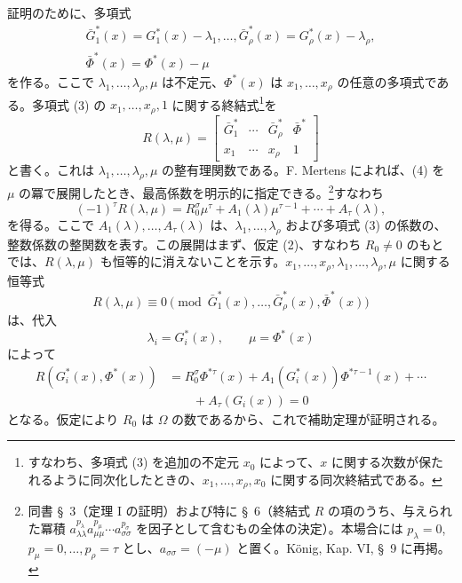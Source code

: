 \documentclass[11pt]{jlreq}
\begin{document}
証明のために、多項式
\begin{equation}
\begin{gathered}
  \bar G_1^*(x)=G_1^*(x)-\lambda_1,
  \ldots,
  \bar G_\rho^*(x)=G_\rho^*(x)-\lambda_\rho,\\
  \bar\Phi^*(x)=\Phi^*(x)-\mu
\end{gathered}
\tag{3}
\end{equation}
を作る。ここで $\lambda_1,\ldots,\lambda_\rho,\mu$ は不定元、$\Phi^*(x)$ は $x_1,\ldots,x_\rho$ の任意の多項式である。多項式 (3) の $x_1,\ldots,x_\rho,1$ に関する終結式\footnote{すなわち、多項式 (3) を追加の不定元 $x_0$ によって、$x$ に関する次数が保たれるように同次化したときの、$x_1,\ldots,x_\rho,x_0$ に関する同次終結式である。}を
\begin{equation}
  R(\lambda,\mu)=\left[
  \begin{array}{cccc}
   \bar G_1^*&\cdots&\bar G_\rho^*&\bar\Phi^*\\
   x_1&\cdots&x_\rho&1
  \end{array}
  \right]
\tag{4}
\end{equation}
と書く。これは $\lambda_1,\ldots,\lambda_\rho,\mu$ の整有理関数である。F. Mertens によれば、(4) を $\mu$ の冪で展開したとき、最高係数を明示的に指定できる。\footnote{同書 \S\ 3（定理 I の証明）および特に \S\ 6（終結式 $R$ の項のうち、与えられた冪積 $a_{\lambda\lambda}^{p_\lambda}a_{\mu\mu}^{p_\mu}\cdots a_{\sigma\sigma}^{p_\sigma}$ を因子として含むもの全体の決定）。本場合には $p_\lambda=0$, $p_\mu=0,\ldots,p_\rho=\tau$ とし、$a_{\sigma\sigma}=(-\mu)$ と置く。König, Kap. VI, \S\ 9 に再掲。}すなわち
\begin{equation}
  (-1)^\tau R(\lambda,\mu)
  =R_0^\sigma\mu^\tau+A_1(\lambda)\mu^{\tau-1}+\cdots+A_\tau(\lambda),
\tag{5}
\end{equation}
を得る。ここで $A_1(\lambda),\ldots,A_\tau(\lambda)$ は、$\lambda_1,\ldots,\lambda_\rho$ および多項式 (3) の係数の、整数係数の整関数を表す。この展開はまず、仮定 (2)、すなわち $R_0\ne0$ のもとでは、$R(\lambda,\mu)$ も恒等的に消えないことを示す。$x_1,\ldots,x_\rho,\lambda_1,\ldots,\lambda_\rho,\mu$ に関する恒等式
\[
  R(\lambda,
\mu)\equiv 0\pmod{\bar G_1^*(x),\ldots,
\bar G_\rho^*(x),\bar\Phi^*(x)}
\]
は、代入
\[
  \lambda_i=G_i^*(x),\qquad \mu=\Phi^*(x)
\]
によって
\begin{equation}
\begin{aligned}
  R(G_i^*(x),\Phi^*(x))
  &=R_0^\sigma\Phi^{*\tau}(x)
    +A_1(G_i^*(x))\Phi^{*\tau-1}(x)+\cdots \\
  &\qquad +A_\tau(G_i(x))=0
\end{aligned}
\tag{6}
\end{equation}
となる。仮定により $R_0$ は $\Omega$ の数であるから、これで補助定理が証明される。
\end{document}
